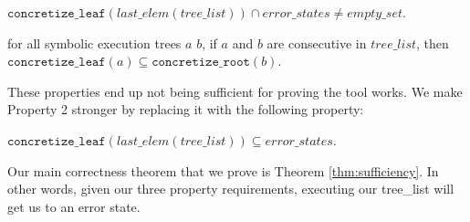 \begin{property}
  \label{prop:enderror}
$ \mathtt{concretize\_leaf} (last\_elem (tree\_list)) \cap error\_states 
\neq empty\_set $.
\end{property}

\begin{property}
  \label{prop:stitch}
for all symbolic execution trees $a$ $b$, 
if $a$ and $b$ are consecutive in $tree\_list$, then 
$\mathtt{concretize\_leaf} (a) \subseteq
\mathtt{concretize\_root}(b) $.
\end{property}

These properties end up not being sufficient for proving the tool works. 
We make Property 2 stronger by replacing it with the following property:

\setcounter{property}{1}
\renewcommand{\theproperty}{Z.\arabic{property}'}
\begin{property}
  \label{prop:correctedz2}
$\mathtt{concretize\_leaf} (last\_elem (tree\_list))
\subseteq error\_states $.
\end{property}



Our main correctness theorem that we prove is Theorem \ref{thm:sufficiency}. In other words, given our three property requirements, executing our tree\_list will get us to an error state.
